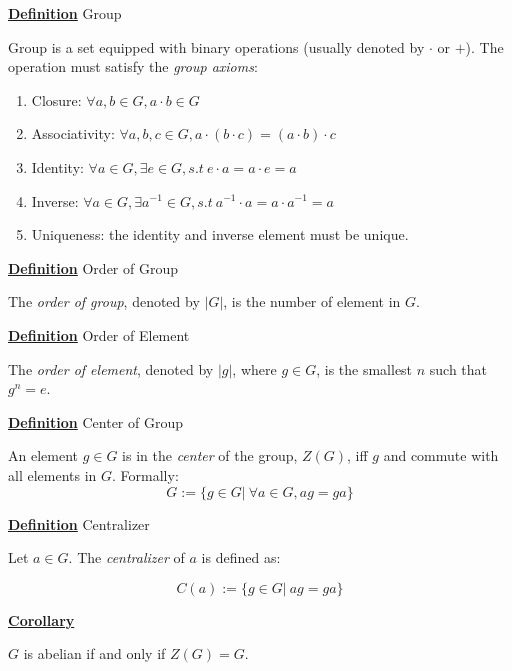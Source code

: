 \documentclass[a4paper, 12pt]{article}
\begin{document}
\textbf{\underline{Definition}} Group

Group is a set equipped with binary operations (usually denoted by 
$\cdot$ or $+$). The operation must satisfy the
\textit{group axioms}:
\begin{enumerate}
    \item Closure: $\forall a,b \in G, a\cdot b \in G$
    \item Associativity: $\forall a,b,c \in G, a\cdot (b\cdot c) = 
        (a\cdot b)\cdot c$
    \item Identity: $\forall a\in G,\exists e\in G, s.t~  
        e\cdot a = a\cdot e = a$
    \item Inverse: $\forall a\in G,\exists a^{-1}\in G, s.t~  
        a^{-1}\cdot a = a\cdot a^{-1}= a$
    \item Uniqueness: the identity and inverse element must be unique.
\end{enumerate}

\textbf{\underline{Definition}} Order of Group

The \textit{order of group}, denoted by $|G|$, is the number of element in $G$.

\vspace{5mm}

\textbf{\underline{Definition}} Order of Element

The \textit{order of element}, denoted by $|g|$, where $g\in G$, is the smallest
$n$ such that $g^n = e$.

\vspace{5mm}

\textbf{\underline{Definition}} Center of Group

An element $g\in G$ is in the \textit{center} of the group, $Z(G)$, iff $g$ and
commute with all elements in $G$. Formally:
$$G := \{g\in G|~ \forall a\in G, ag = ga\}$$

\vspace{5mm}

\textbf{\underline{Definition}} Centralizer

Let $a\in G$. The \textit{centralizer} of $a$ is defined as:

$$C(a) := \{g\in G|~ ag = ga\}$$


\vspace{5mm}

\textbf{\underline{Corollary}}

$G$ is abelian if and only if $Z(G) = G$.

\vspace{5mm}
\end{document}
